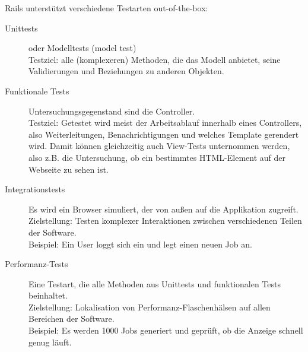 Rails unterstützt verschiedene Testarten out-of-the-box:
\begin{description}
 \item[Unittests] oder Modelltests (model test)\\
 Testziel: alle (komplexeren) Methoden, die das Modell anbietet, seine Validierungen und Beziehungen zu anderen Objekten.
 \item[Funktionale Tests] Untersuchungsgegenstand sind die Controller. \\
 Testziel: Getestet wird meist der Arbeitsablauf innerhalb eines Controllers, also Weiterleitungen, Benachrichtigungen und welches Template gerendert wird.
 Damit können gleichzeitig auch View-Tests unternommen werden, also z.B. die Untersuchung, ob ein bestimmtes HTML-Element auf der Webseite zu sehen ist.
 \item[Integrationstests] Es wird ein Browser simuliert, der von außen auf die Applikation zugreift.\\
 Zielstellung: Testen komplexer Interaktionen zwischen verschiedenen Teilen der Software.\\
 Beispiel: Ein User loggt sich ein und legt einen neuen Job an.
 \item[Performanz-Tests] Eine Testart, die alle Methoden aus Unittests und funktionalen Tests beinhaltet.\\
 Zielstellung: Lokalisation von Performanz-Flaschenhälsen auf allen Bereichen der Software. \\
 Beispiel: Es werden 1000 Jobs generiert und geprüft, ob die Anzeige schnell genug läuft.
\end{description}

